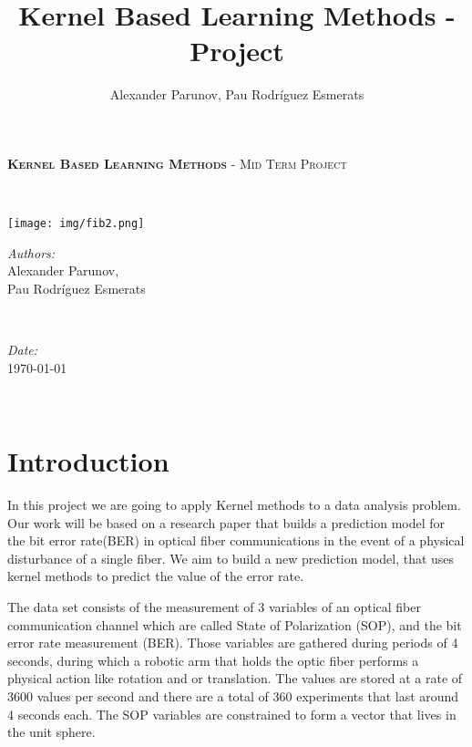 \documentclass[a4paper]{article}
\title{Kernel Based Learning Methods - Project}
\author{Alexander Parunov, Pau Rodríguez Esmerats }
\begin{document}
%



\begin{minipage}{0.6\textwidth}
\begin{flushleft} \large
\textsc{\textbf{\Large Kernel Based Learning Methods }} - \textsc{\large Mid Term Project }\\[0.5cm] %
\end{flushleft}
\end{minipage}
~
\begin{minipage}{0.4\textwidth}
\begin{flushright} \large
\texttt{[image: img/fib2.png]}\\[0.3cm]
\end{flushright}
\end{minipage}
 


\begin{minipage}{0.7\textwidth}
\begin{flushleft} 
\emph{Authors:}\\
Alexander Parunov, \\ Pau Rodríguez Esmerats
\end{flushleft}
\end{minipage}
~
\begin{minipage}{0.3\textwidth}
\begin{flushleft}
\emph{Date:}\\
\today
\end{flushleft}
\end{minipage}\\[0.5cm]


\section{Introduction}

In this project we are going to apply Kernel methods to a data analysis problem. Our work will be based on a research paper that builds a prediction model for the bit error rate(BER) in optical fiber communications in the event of a physical disturbance of a single fiber. We aim to build a new prediction model, that uses kernel methods to predict the value of the error rate.

The data set consists of the measurement of 3 variables of an optical fiber communication channel which are called State of Polarization (SOP), and the bit error rate measurement (BER). Those variables are gathered during periods of 4 seconds, during which a robotic arm that holds the optic fiber performs a physical action like rotation and or translation. The values are stored at a rate of 3600 values per second and there are a total of 360 experiments that last around 4 seconds each. The SOP variables are constrained to form a vector that lives in the unit sphere.
\end{document}

